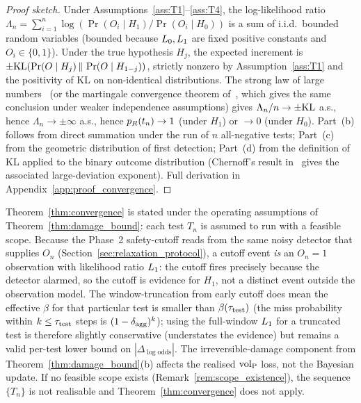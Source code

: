 \begin{proof}[Proof sketch]
Under Assumptions~\ref{ass:T1}--\ref{ass:T4}, the log-likelihood
ratio
$\Lambda_n = \sum_{i=1}^n \log(\Pr(O_i \mid H_1)/\Pr(O_i \mid H_0))$
is a sum of i.i.d.\ bounded random variables (bounded because
$L_0, L_1$ are fixed positive constants and
$O_i \in \{0, 1\}$).  Under the true hypothesis $H_j$, the
expected increment is $\pm \mathrm{KL}(\Pr(O \mid H_j) \,\|\,
\Pr(O \mid H_{1-j}))$, strictly nonzero by
Assumption~\ref{ass:T1} and the positivity of KL on
non-identical distributions.  The strong law of large
numbers~\citep[Ch.~6]{cover2006elements} (or the martingale
convergence theorem of~\citet{doob1953stochastic}, which gives
the same conclusion under weaker independence assumptions) gives
$\Lambda_n / n \to \pm \mathrm{KL}$ a.s., hence
$\Lambda_n \to \pm \infty$ a.s., hence $p_R(t_n) \to 1$ (under
$H_1$) or $\to 0$ (under $H_0$).  Part~(b) follows from
direct summation under the run of $n$ all-negative tests;
Part~(c) from the geometric distribution of first detection;
Part~(d) from the definition of KL applied to the binary outcome
distribution (Chernoff's result
in~\citet{chernoff1952measure} gives the associated
large-deviation exponent).  Full derivation in
Appendix~\ref{app:proof_convergence}.
\end{proof}

\begin{remark}
\label{rem:convergence_depends_on_damage}
Theorem~\ref{thm:convergence} is stated under the operating
assumptions of Theorem~\ref{thm:damage_bound}: each test $T_n$
is assumed to run with a feasible scope.  Because the Phase~2
safety-cutoff reads from the same noisy detector that supplies
$O_n$ (Section~\ref{sec:relaxation_protocol}), a cutoff event
\emph{is} an $O_n = 1$ observation with likelihood ratio
$L_1$: the cutoff fires precisely because the detector
alarmed, so the cutoff is evidence for $H_1$, not a distinct
event outside the observation model.  The window-truncation from
early cutoff does mean the effective $\beta$ for that particular
test is smaller than $\beta(\tau_{\mathrm{test}})$ (the miss probability
within $k \leq \tau_{\mathrm{test}}$ steps is $(1-\delta_{\mathrm{agg}})^k$); using the
full-window $L_1$ for a truncated test is therefore slightly
conservative (understates the evidence) but remains a valid
per-test lower bound on $|\Delta_{\log\mathrm{odds}}|$.  The
irreversible-damage component from
Theorem~\ref{thm:damage_bound}(b) affects the realised ${\operatorname{vol}_{\mathrm{P}}}$
loss, not the Bayesian update.  If no feasible scope exists
(Remark~\ref{rem:scope_existence}), the sequence $\{T_n\}$ is
not realisable and Theorem~\ref{thm:convergence} does not apply.
\end{remark}

